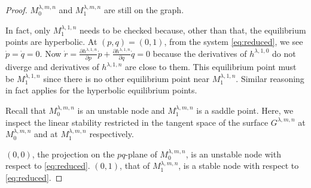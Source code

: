 \documentclass[a4paper,11pt]{article}
\def\red{\color{red}}
\begin{document}
\begin{proof}
\medskip {} 
 $M_0^{\lambda,m,n}$ and $M_1^{\lambda,m,n}$ are still on the graph.
\medskip

In fact, only $M_1^{ \lambda,1,n}$ needs to be checked because, other than that, the equilibrium points are hyperbolic. At $(p,q)=(0,1)$, from the system \eqref{eq:reduced}, we see $\dot{p} = \dot{q} = 0$. Now $\dot{r} = \frac{\partial h^{\lambda,1,n}}{\partial p} \dot{p} + \frac{\partial h^{\lambda,1,n}}{\partial q} \dot{q} = 0$ %
because the derivatives of $h^{\lambda,1,0}$ do not diverge and derivatives of $h^{\lambda,1,n}$ are close to them. This equilibrium point must be $M_1^{\lambda,1,n}$ since there is no other equilibrium point near $M_1^{\lambda,1,n}$. Similar reasoning in fact applies for the hyperbolic equilibrium points.

\medskip
Recall that $M_0^{\lambda,m,n}$ is an unstable node and $M_1^{\lambda,m,n}$ is a saddle point. Here, we inspect the linear stability restricted in the tangent space of the surface $G^{\lambda,m,n}$ at $M_0^{\lambda,m,n}$ and at $M_1^{\lambda,m,n}$ respectively. 

\medskip {} 
 $(0,0)$, the projection on the $pq$-plane of $M_0^{\lambda,m,n}$, is an unstable node with respect to \eqref{eq:reduced}. $(0,1)$, that of $M_1^{\lambda,m,n}$, is a stable node with respect to \eqref{eq:reduced}.
\medskip


\end{proof}
\end{document}

